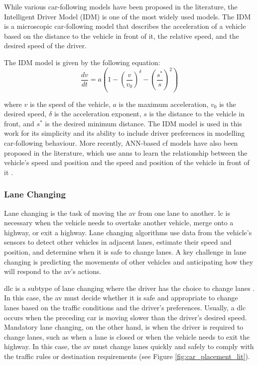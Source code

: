 While various car-following models have been proposed in the literature, the Intelligent Driver Model (IDM) \cite{treiber1999, PhysRevE.62.1805} is one of the most widely used models. The IDM is a microscopic car-following model that describes the acceleration of a vehicle based on the distance to the vehicle in front of it, the relative speed, and the desired speed of the driver.

The IDM model is given by the following equation:
\begin{equation}
    \frac{dv}{dt} = a \left( 1 - \left( \frac{v}{v_0} \right)^\delta - \left( \frac{s^*}{s} \right)^2 \right)
\end{equation}

where $v$ is the speed of the vehicle, $a$ is the maximum acceleration, $v_0$ is the desired speed, $\delta$ is the acceleration exponent, $s$ is the distance to the vehicle in front, and $s^*$ is the desired minimum distance. The IDM model is used in this work for its simplicity and its ability to include driver preferences in modelling car-following behaviour. More recently, ANN-based \gls{cf} models have also been proposed in the literature, which use \glspl{ann} to learn the relationship between the vehicle's speed and position and the speed and position of the vehicle in front of it \cite{zhang_simultaneous_2019}. 


\subsubsection{Lane Changing}
Lane changing is the task of moving the  \gls{av} from one lane to another. \gls{lc} is necessary when the vehicle needs to overtake another vehicle, merge onto a highway, or exit a highway. Lane changing algorithms use data from the vehicle's sensors to detect other vehicles in adjacent lanes, estimate their speed and position, and determine when it is safe to change lanes. A key challenge in lane changing is predicting the movements of other vehicles and anticipating how they will respond to the  \gls{av}'s actions. 

\gls{dlc} is a subtype of lane changing where the driver has the choice to change lanes \cite{balal_analysis_2014}. In this case, the  \gls{av} must decide whether it is safe and appropriate to change lanes based on the traffic conditions and the driver's preferences. Usually, a \gls{dlc} occurs when the preceding car is moving slower than the driver's desired speed. Mandatory lane changing, on the other hand, is when the driver is required to change lanes, such as when a lane is closed or when the vehicle needs to exit the highway. In this case, the  \gls{av} must change lanes quickly and safely to comply with the traffic rules or destination requirements (see Figure \ref{fig:car_placement_lit}).

